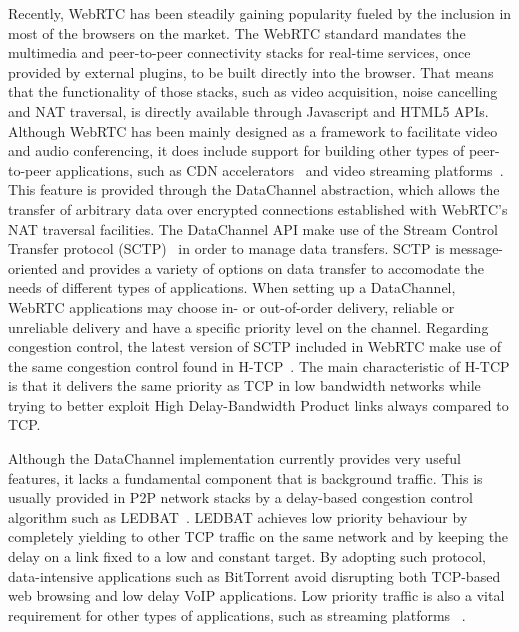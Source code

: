 \documentclass{sig-alternate}
\begin{document}

Recently, WebRTC has been steadily gaining popularity fueled by the inclusion in most of
the browsers on the market. The WebRTC standard mandates the multimedia and peer-to-peer
connectivity stacks for real-time services, once provided by external plugins, to be built
directly into the browser. That means that the functionality of those stacks, such as
video acquisition, noise cancelling and NAT traversal, is directly available through
Javascript and HTML5 APIs. Although WebRTC has been mainly designed as a framework to
facilitate video and audio conferencing, it does include support for building other types
of peer-to-peer applications, such as CDN accelerators~\cite{peerCDN} and video streaming
platforms~\cite{nurminen2013p2p}. This feature is provided through the DataChannel
abstraction, which allows the transfer of arbitrary data over encrypted connections
established with WebRTC's NAT traversal facilities. The DataChannel API make use of the
Stream Control Transfer protocol (SCTP)~\cite{sctp-rfc} in order to manage data
transfers. SCTP is message-oriented and provides a variety of options on data
transfer to accomodate the needs of different types of applications. When setting up a
DataChannel, WebRTC applications may choose in- or out-of-order delivery, reliable or
unreliable delivery and have a specific priority level on the channel. Regarding
congestion control, the latest version of SCTP included in WebRTC make use of the same
congestion control found in H-TCP~\cite{htcp}. The main characteristic of H-TCP is that it
delivers the same priority as TCP in low bandwidth networks while trying to better exploit
High Delay-Bandwidth Product links always compared to TCP.

Although the DataChannel implementation currently provides very useful features, it lacks
a fundamental component that is background traffic. This is usually provided in P2P
network stacks by a delay-based congestion control algorithm such as LEDBAT~\cite{ledbat}. 
LEDBAT achieves low priority behaviour by completely yielding to other TCP traffic on the same
network and by keeping the delay on a link fixed to a low and constant target. By adopting
such protocol, data-intensive applications such as BitTorrent avoid disrupting both
TCP-based web browsing and low delay VoIP applications. Low priority traffic is also a
vital requirement for other types of applications, such as streaming
platforms ~\cite{smoothcache}\cite{roberto-thesis}.
\end{document}
